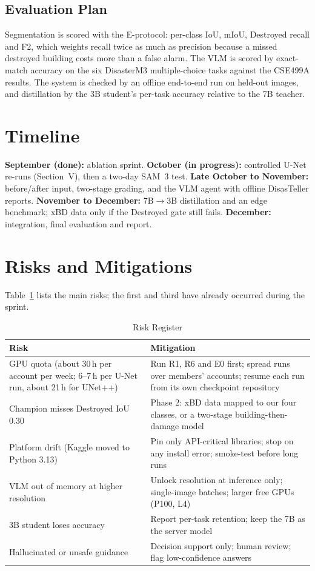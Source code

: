 \documentclass[conference]{IEEEtran}
\begin{document}
\subsection{Evaluation Plan}
Segmentation is scored with the E-protocol: per-class IoU, mIoU, Destroyed recall and F2, which weights recall twice as much as precision because a missed destroyed building costs more than a false alarm. The VLM is scored by exact-match accuracy on the six DisasterM3 multiple-choice tasks against the CSE499A results. The system is checked by an offline end-to-end run on held-out images, and distillation by the 3B student's per-task accuracy relative to the 7B teacher.

\section{Timeline}
\textbf{September (done):} ablation sprint. \textbf{October (in progress):} controlled U-Net re-runs (Section~V), then a two-day SAM~3 test. \textbf{Late October to November:} before/after input, two-stage grading, and the VLM agent with offline DisasTeller reports. \textbf{November to December:} 7B$\rightarrow$3B distillation and an edge benchmark; xBD data only if the Destroyed gate still fails. \textbf{December:} integration, final evaluation and report.

\section{Risks and Mitigations}
Table~\ref{tab:risks} lists the main risks; the first and third have already occurred during the sprint.

\begin{table}[t]
\caption{Risk Register}
\label{tab:risks}
\centering
\footnotesize
\setlength{\tabcolsep}{4pt}
\begin{tabular}{@{}>{\raggedright\arraybackslash}p{3.2cm}>{\raggedright\arraybackslash}p{5.0cm}@{}}
\toprule
Risk & Mitigation\\
\midrule
GPU quota (about 30\,h per account per week; 6--7\,h per U-Net run, about 21\,h for UNet++) & Run R1, R6 and E0 first; spread runs over members' accounts; resume each run from its own checkpoint repository\\
Champion misses Destroyed IoU 0.30 & Phase 2: xBD data mapped to our four classes, or a two-stage building-then-damage model\\
Platform drift (Kaggle moved to Python 3.13) & Pin only API-critical libraries; stop on any install error; smoke-test before long runs\\
VLM out of memory at higher resolution & Unlock resolution at inference only; single-image batches; larger free GPUs (P100, L4)\\
3B student loses accuracy & Report per-task retention; keep the 7B as the server model\\
Hallucinated or unsafe guidance & Decision support only; human review; flag low-confidence answers\\
\bottomrule
\end{tabular}
\end{table}
\end{document}
